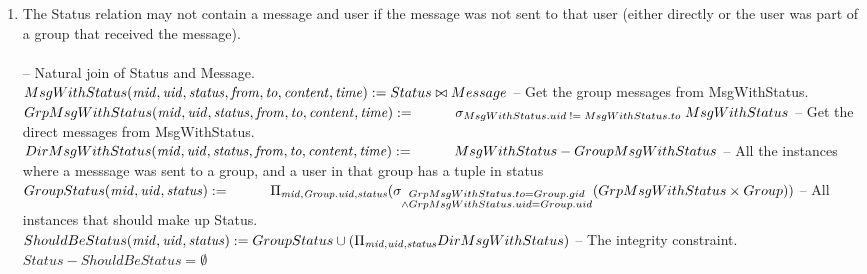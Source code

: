 \documentclass{article}
\newcommand{\var}[1]{\mathit{#1}}
\begin{document}
\begin{enumerate}
 
\item
The Status relation may not contain a message and user if the message was not sent to that user (either directly or the user was part of a group that received the message). \\\\ [5pt]
{\large
\hspace*{1cm} -- Natural join of Status and Message.\\ [5pt]
$
MsgWithStatus(\var{mid}, \var{uid}, \var{status}, \var{from}, \var{to}, \var{content}, \var{time}) := 
	Status \bowtie Message \\\\ [5pt]
$ 
\hspace*{1cm} -- Get the group messages from MsgWithStatus. \\ [5pt]
$
GrpMsgWithStatus(\var{mid}, \var{uid}, \var{status}, \var{from}, \var{to}, \var{content}, \var{time}) := \\ [5pt]
\hspace*{1cm}
	\sigma_{MsgWithStatus.uid \; != \; MsgWithStatus.to} \; MsgWithStatus \\\\ [5pt]
$
\hspace*{1cm} -- Get the direct messages from MsgWithStatus. \\ [5pt]
$
DirMsgWithStatus(\var{mid}, \var{uid}, \var{status}, \var{from}, \var{to}, \var{content}, \var{time}) := \\ [5pt]
\hspace*{1cm}
	MsgWithStatus - GroupMsgWithStatus \\\\ [5pt]
$
\hspace*{1cm} -- All the instances where a messsage was sent to a group, and a user in that \hspace*{1cm}group has a tuple in status \\ [5pt]
$
GroupStatus(\var{mid}, \var{uid}, \var{status}) := \\ [5pt]
	\hspace*{1cm}\Pi_{\var{mid}, \var{Group.uid}, \var{status}}
	(\sigma_{\substack{GrpMsgWithStatus.to = Group.gid \\
			\wedge GrpMsgWithStatus.uid = Group.uid}}
			(GrpMsgWithStatus \times Group)) \\\\\\ [5pt]
$
\hspace*{1cm} -- All instances that should make up Status. \\ [5pt]
$
ShouldBeStatus(\var{mid}, \var{uid}, \var{status}) :=
	GroupStatus \cup
	(\Pi_{\var{mid}, \var{uid}, \var{status}} DirMsgWithStatus) \\\\ [5pt]
$
\hspace*{1cm} -- The integrity constraint. \\ [5pt]
$
Status - ShouldBeStatus = \emptyset
$
}
\end{enumerate}
\end{document}
